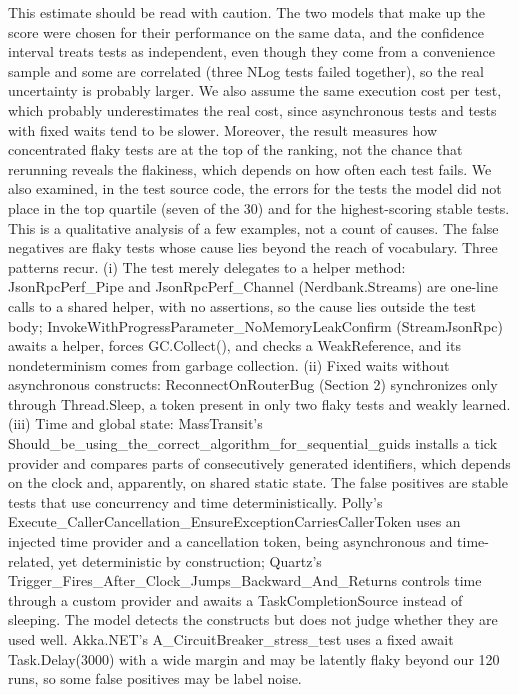 This estimate should be read with caution. The two models that make up the score were chosen for their performance on the same data, and the confidence interval treats tests as independent, even though they come from a convenience sample and some are correlated (three NLog tests failed together), so the real uncertainty is probably larger. We also assume the same execution cost per test, which probably underestimates the real cost, since asynchronous tests and tests with fixed waits tend to be slower. Moreover, the result measures how concentrated flaky tests are at the top of the ranking, not the chance that rerunning reveals the flakiness, which depends on how often each test fails.
We also examined, in the test source code, the errors for the tests the model did not place in the top quartile (seven of the 30) and for the highest-scoring stable tests. This is a qualitative analysis of a few examples, not a count of causes. The false negatives are flaky tests whose cause lies beyond the reach of vocabulary. Three patterns recur. (i) The test merely delegates to a helper method: JsonRpcPerf\_Pipe and JsonRpcPerf\_Channel (Nerdbank.Streams) are one-line calls to a shared helper, with no assertions, so the cause lies outside the test body; InvokeWithProgressParameter\_NoMemoryLeakConfirm (StreamJsonRpc) awaits a helper, forces GC.Collect(), and checks a WeakReference, and its nondeterminism comes from garbage collection. (ii) Fixed waits without asynchronous constructs: ReconnectOnRouterBug (Section 2) synchronizes only through Thread.Sleep, a token present in only two flaky tests and weakly learned. (iii) Time and global state: MassTransit's Should\_be\_using\_the\_correct\_algorithm\_for\_sequential\_guids installs a tick provider and compares parts of consecutively generated identifiers, which depends on the clock and, apparently, on shared static state.
The false positives are stable tests that use concurrency and time deterministically. Polly's Execute\_CallerCancellation\_EnsureExceptionCarriesCallerToken uses an injected time provider and a cancellation token, being asynchronous and time-related, yet deterministic by construction; Quartz's Trigger\_Fires\_After\_Clock\_Jumps\_Backward\_And\_Returns controls time through a custom provider and awaits a TaskCompletionSource instead of sleeping. The model detects the constructs but does not judge whether they are used well. Akka.NET's A\_CircuitBreaker\_stress\_test uses a fixed await Task.Delay(3000) with a wide margin and may be latently flaky beyond our 120 runs, so some false positives may be label noise.

